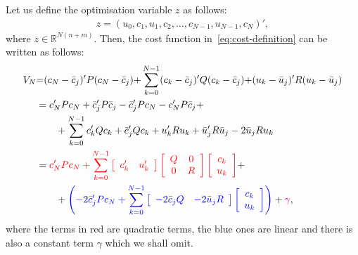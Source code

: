 \documentclass[12pt]{scrartcl}
\renewcommand{\Re}{\mathbb{R}}
\newcommand{\bcj}{\bar{c}_j}
\newcommand{\buj}{\bar{u}_j}
\begin{document}
Let us define the optimisation variable $z$ as follows:
\begin{align}
z=\left( u_0, c_1, u_1, c_2, \ldots, c_{N-1}, u_{N-1}, c_{N}\right)',
\end{align}
where $z\in\Re^{N(n+m)}$. Then, the cost function in~\eqref{eq:cost-definition}
can be written as follows:
\begin{align*}
V_N &{=} (c_N-\bcj)'P(c_N-\bcj) {+} \sum_{k=0}^{N-1}(c_k-\bcj)'Q(c_k-\bcj){+} 
		(u_k-\buj)'R(u_k-\buj)\\
		&= c_N' P c_N + \bcj' P \bcj - \bcj' P c_N - c_N' P \bcj +\\
		  &\qquad + \sum_{k=0}^{N-1} c_k' Q c_k + \bcj' Q c_k + u_k' R u_k + \buj' R \buj - 2\buj R u_k\\
		&=\textcolor{red}{c_N' P c_N + \sum_{k=0}^{N-1} \left[ \begin{array}{cc}c_k' & u_k'\end{array}\right]
\left[ \begin{array}{cc}
Q & 0\\0 & R
\end{array}\right]
\left[ \begin{array}{c}
c_k\\
u_k
\end{array}\right]}+\\
&\qquad+\textcolor{blue}{\left( 
-2\bcj' P c_N + 
\sum_{k=0}^{N-1}\left[ \begin{array}{cc}
-2\bcj Q & -2\buj R
\end{array}\right]\left[ 
\begin{array}{c}
c_k\\u_k
\end{array}\right]
\right)}+\textcolor{magenta}{\gamma},
\end{align*}
where the terms in red are quadratic terms, the blue ones are linear and
there is also a constant term $\gamma$ which we shall omit.
\end{document}
